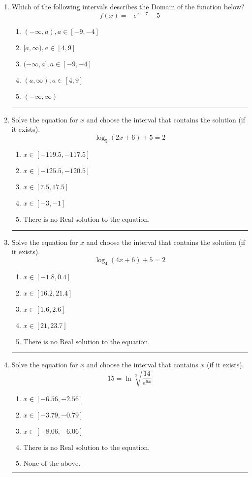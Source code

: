 \documentclass[14pt]{extbook}
\newcommand{\litem}[1]{\item#1\hspace*{-1cm}\rule{\textwidth}{0.4pt}}
\begin{document}
\begin{enumerate}
{\begin{enumerate}[label=\Alph*.]
\end{enumerate} }
\litem{
Which of the following intervals describes the Domain of the function below?\[ f(x) = -e^{x-7}-5 \]\begin{enumerate}[label=\Alph*.]
\item \( (-\infty, a), a \in [-9, -4] \)
\item \( [a, \infty), a \in [4, 9] \)
\item \( (-\infty, a], a \in [-9, -4] \)
\item \( (a, \infty), a \in [4, 9] \)
\item \( (-\infty, \infty) \)

\end{enumerate} }
\litem{
Solve the equation for $x$ and choose the interval that contains the solution (if it exists).\[ \log_{5}{(2x+6)}+5 = 2 \]\begin{enumerate}[label=\Alph*.]
\item \( x \in [-119.5, -117.5] \)
\item \( x \in [-125.5, -120.5] \)
\item \( x \in [7.5, 17.5] \)
\item \( x \in [-3, -1] \)
\item \( \text{There is no Real solution to the equation.} \)

\end{enumerate} }
\litem{
Solve the equation for $x$ and choose the interval that contains the solution (if it exists).\[ \log_{4}{(4x+6)}+5 = 2 \]\begin{enumerate}[label=\Alph*.]
\item \( x \in [-1.8, 0.4] \)
\item \( x \in [16.2, 21.4] \)
\item \( x \in [1.6, 2.6] \)
\item \( x \in [21, 23.7] \)
\item \( \text{There is no Real solution to the equation.} \)

\end{enumerate} }
\litem{
 Solve the equation for $x$ and choose the interval that contains $x$ (if it exists).\[  15 = \ln{\sqrt[3]{\frac{14}{e^{6x}}}} \]\begin{enumerate}[label=\Alph*.]
\item \( x \in [-6.56, -2.56] \)
\item \( x \in [-3.79, -0.79] \)
\item \( x \in [-8.06, -6.06] \)
\item \( \text{There is no Real solution to the equation.} \)
\item \( \text{None of the above.} \)


\end{enumerate}}
\end{enumerate}
\end{document}
